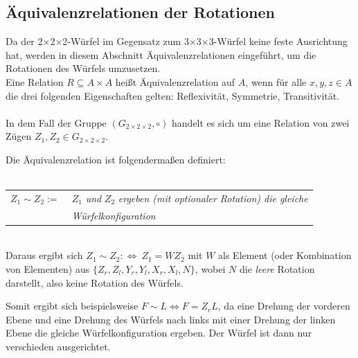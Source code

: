 \documentclass[12pt,a4paper, usenames, dvipsnames]{article}
\newcommand{\Gtwo}{\ensuremath{G_{2\times 2\times 2}}}
\newcommand{\Ttwo}{2$\times$2$\times$2-}
\newcommand{\Tthree}{3$\times$3$\times$3-}
\begin{document}

%
%
%
%
%
%
%
%
%
%
%
%
%
%
%
%
%
%
%
%
\color{black}

\subsection*{Äquivalenzrelationen der Rotationen}

Da der \Ttwo Würfel im Gegensatz zum \Tthree Würfel keine feste Ausrichtung hat, werden in diesem Abschnitt Äquivalenzrelationen eingeführt, um die Rotationen des Würfels umzusetzen. \\
Eine Relation $R \subseteq A \times A$ heißt Äquivalenzrelation auf $A$, wenn für alle $x, y, z \in A$ die drei folgenden Eigenschaften gelten: Reflexivität, Symmetrie, Transitivität. \cite{Buch} \\
\\
In dem Fall der Gruppe $(\Gtwo, \circ)$ handelt es sich um eine Relation von zwei Zügen $Z_1, Z_2 \in \Gtwo$. 

Die Äquivalenzrelation ist folgendermaßen definiert: 
\\ \\
\begin{tabular}{l l}
$Z_1 \sim Z_2 := \ $  & $Z_1$ \textit{und} $Z_2$ \textit{ergeben (mit optionaler Rotation) die gleiche }\\
\  & \textit{Würfelkonfiguration} \\
\end{tabular} 
\\

Daraus ergibt sich $Z_1 \sim Z_2 :\Leftrightarrow \ Z_1 = WZ_2$ mit $W$ als Element (oder Kombination von Elementen) aus $\{{Z_r}, {Z_l}, {Y_r}, {Y_l}, {X_r}, {X_l}, N\}$, wobei $N$ die \textit{leere} Rotation darstellt, also keine Rotation des Würfels. 

Somit ergibt sich beispielsweise $F \sim L \Leftrightarrow F = Z_rL$, da eine Drehung der vorderen Ebene und eine Drehung des Würfels nach links mit einer Drehung der linken Ebene die gleiche Würfelkonfiguration ergeben. Der Würfel ist dann nur verschieden ausgerichtet. 
\end{document}
